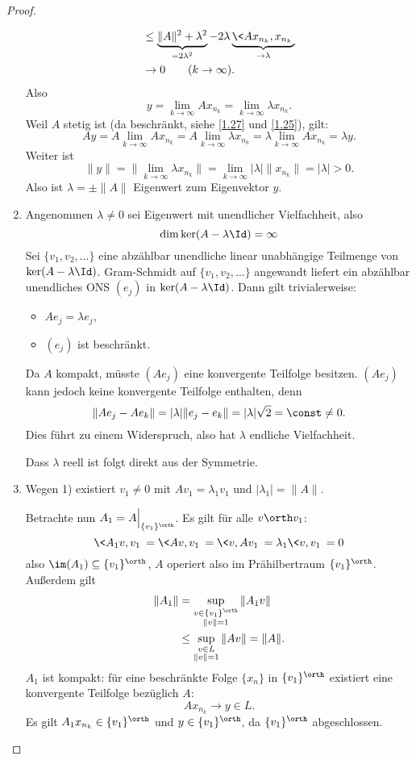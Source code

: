 \begin{st}
\begin{proof}
\begin{enumerate}[1)]
\begin{align*}
					&\le \underbrace{\|A\|^2 + \lambda^2}_{=2\lambda^2} - 2 \lambda \underbrace{\<Ax_{n_k}, x_{n_k}\>}_{\to \lambda} \\
					& \to 0 \qquad (k\to \infty).
				\end{align*}
				Also 
				\[
					y = \lim_{k\to \infty} Ax_{n_k} = \lim_{k\to \infty} \lambda x_{n_k}.
				\]
				Weil $A$ stetig ist (da beschränkt, siehe \ref{1.27} und \ref{1.25}), gilt:
				\[
					Ay 
					= A \lim_{k\to\infty} A x_{n_k} 
					= A \lim_{k\to\infty} \lambda x_{n_k}
					= \lambda \lim_{k\to\infty} Ax_{n_k}
					= \lambda y.
				\]
				Weiter ist
				\[
					\|y\| 
					= \Big\|\lim_{k\to\infty} \lambda x_{n_k}\Big\|
					= \lim_{k\to\infty} |\lambda| \|x_{n_k}\|
					= |\lambda|
					> 0.
				\]
				Also ist $\lambda = \pm \|A\|$ Eigenwert zum Eigenvektor $y$. 
			\item
{}

				Angenommen $\lambda \neq 0$ sei Eigenwert mit unendlicher Vielfachheit, also
				\[
					\dim \ker (A - \lambda \Id) = \infty
				\]
				Sei $\{v_1,v_2,\dotsc\}$ eine abzählbar unendliche linear unabhängige Teilmenge von $\ker(A-\lambda \Id)$.
				Gram-Schmidt auf $\{v_1,v_2,\dotsc\}$ angewandt liefert ein abzählbar unendliches ONS $(e_j)$ in $\ker (A-\lambda \Id)$.
				Dann gilt trivialerweise:
				\begin{itemize}
					\item
						$Ae_j = \lambda e_j$,
					\item
						$(e_j)$ ist beschränkt.
				\end{itemize}
				Da $A$ kompakt, müsste $(Ae_j)$ eine konvergente Teilfolge besitzen.
				$(Ae_j)$ kann jedoch keine konvergente Teilfolge enthalten, denn
				\[
					\|Ae_j - Ae_k\| = |\lambda| \|e_j-e_k\| = |\lambda| \sqrt 2 = \const \neq 0.
				\]
				Dies führt zu einem Widerspruch, also hat $\lambda$ endliche Vielfachheit.

				Dass $\lambda$ reell ist folgt direkt aus der Symmetrie.
			\item
				Wegen 1) existiert $v_1 \neq 0$ mit $Av_1 = \lambda_1v_1$ und $|\lambda_1| = \|A\|$.

				Betrachte nun $A_1 = A \Big|_{\{v_1\}^\orth}$.
				Es gilt für alle $v \orth v_1$:
				\[
					\<A_1v,v_1\> = \<Av,v_1\> = \<v,Av_1\> = \lambda_1\<v,v_1\> = 0
				\]
				also $\im (A_1) \subset \{v_1\}^\orth$, $A$ operiert also im Prähilbertraum $\{v_1\}^\orth$.
				Außerdem gilt
				\begin{align*}
					\|A_1\| 
					&= \sup_{\substack{v\in \{v_1\}^\orth \\ \|v\|=1}} \|A_1 v\| \\
					&\le \sup_{\substack{v\in L \\ \|v\|=1}} \|A v\| 
					= \|A\|.
				\end{align*}
				$A_1$ ist kompakt: für eine beschränkte Folge $\{x_n\}$ in $\{v_1\}^\orth$ existiert eine konvergente Teilfolge bezüglich $A$:
				\[
					A x_{n_k} \to y \in L.
				\]
				Es gilt $A_1 x_{n_k} \in \{v_1\}^\orth$ und $y \in \{v_1\}^\orth$, da $\{v_1\}^\orth$ abgeschlossen.


\end{enumerate}
\end{proof}
\end{st}
